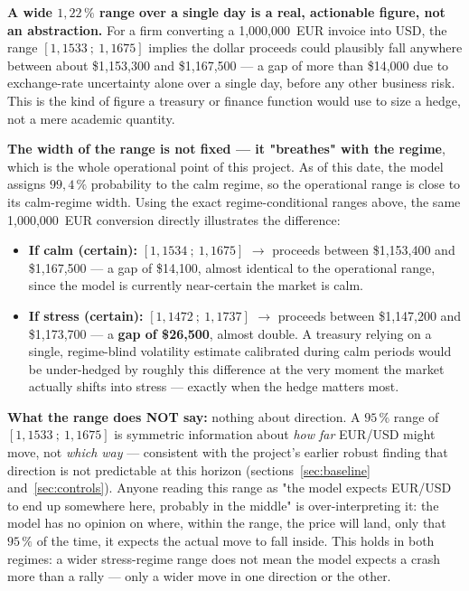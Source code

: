 \documentclass[12pt,a4paper]{article}
\begin{document}
\begin{econbox}
	\textbf{A wide $1{,}22\,\%$ range over a single day is a
		real, actionable figure, not an abstraction.} For a
	firm converting a 1,000,000~EUR invoice into USD, the
	range $[1{,}1533~;~1{,}1675]$ implies the dollar proceeds
	could plausibly fall anywhere between about
	\$1,153,300 and \$1,167,500 --- a gap of more than \$14,000 due to
	exchange-rate uncertainty alone over a single day, before any
	other business risk. This is the kind of figure a treasury or
	finance function would use to size a hedge, not
	a mere academic quantity.
	
	\textbf{The width of the range is not fixed --- it
		"breathes" with the regime}, which is the whole
	operational point of this project. As of this date, the model assigns
	$99{,}4\,\%$ probability to the calm regime, so the
	operational range is close to its calm-regime width.
	Using the exact regime-conditional ranges above, the same
	1,000,000~EUR conversion directly illustrates the
	difference:
	\begin{itemize}
		\item \textbf{If calm (certain):} $[1{,}1534~;~1{,}1675]$ $\to$
		proceeds between \$1,153,400 and \$1,167,500 --- a gap of
		\$14,100, almost identical to the operational range, since
		the model is currently near-certain the market is calm.
		\item \textbf{If stress (certain):} $[1{,}1472~;~1{,}1737]$ $\to$
		proceeds between \$1,147,200 and \$1,173,700 --- a
		\textbf{gap of \$26,500}, almost double. A treasury relying
		on a single, regime-blind volatility estimate calibrated
		during calm periods would be under-hedged by roughly this
		difference at the very moment the market actually shifts into
		stress --- exactly when the hedge matters most.
	\end{itemize}
	
	\textbf{What the range does NOT say:} nothing about direction. A
	$95\,\%$ range of $[1{,}1533~;~1{,}1675]$ is symmetric
	information about \emph{how far} EUR/USD might move, not
	\emph{which way} --- consistent with the project's earlier
	robust finding that direction is not predictable at this
	horizon (sections~\ref{sec:baseline} and~\ref{sec:controls}). Anyone
	reading this range as "the model expects EUR/USD to end up
	somewhere here, probably in the middle" is
	over-interpreting it: the model has no opinion on where, within the
	range, the price will land, only that $95\,\%$ of the time, it
	expects the actual move to fall inside. This holds
	in both regimes: a wider stress-regime range does not mean the
	model expects a crash more than a rally --- only a
	wider move in one direction or the other.
\end{econbox}
\end{document}
